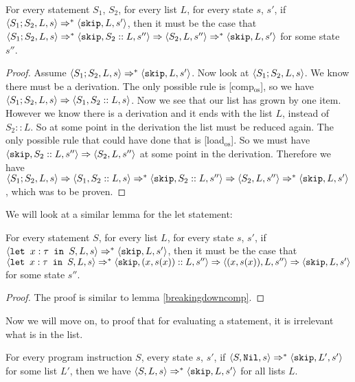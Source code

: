 \begin{lemma}
\label{breakingdowncomp}
For every statement $S_1$, $S_2$, for every list $L$, for every state $s$, $s'$, if $\langle S_1; S_2, L, s \rangle \Rightarrow ^{*} \langle \texttt{skip}, L, s' \rangle$, then it must be the case that $\langle S_1;S_2, L, s \rangle \Rightarrow ^{*} \langle \texttt{skip}, S_2::L, s'' \rangle \Rightarrow \langle S_2, L, s'' \rangle \Rightarrow ^{*} \langle \texttt{skip}, L, s' \rangle$ for some state $s''$. 
\end{lemma}

\begin{proof}
Assume $\langle S_1; S_2, L, s  \rangle \Rightarrow ^{*} \langle \texttt{skip}, L, s' \rangle$. Now look at $\langle S_1; S_2, L, s \rangle$. We know there must be a derivation. The only possible rule is [comp$_{\textrm{os}}$], so we have $\langle S_1; S_2, L, s \rangle \Rightarrow \langle S_1, S_2::L, s \rangle$. Now we see that our list has grown by one item. However we know there is a derivation and it ends with the list $L$, instead of $S_2::L$. So at some point in the derivation the list must be reduced again. The only possible rule that could have done that is [load$_{\textrm{os}}$]. So we must have $\langle \texttt{skip}, S_2::L, s'' \rangle \Rightarrow \langle S_2, L, s'' \rangle$ at some point in the derivation. Therefore we have $\langle S_1; S_2, L, s \rangle \Rightarrow \langle S_1, S_2::L, s \rangle \Rightarrow ^{*} \langle \texttt{skip}, S_2::L, s'' \rangle \Rightarrow \langle S_2, L, s'' \rangle \Rightarrow ^{*} \langle \texttt{skip}, L, s' \rangle$, which was to be proven.
\end{proof}

We will look at a similar lemma for the let statement:

\begin{lemma}
\label{breakingdownlet}
For every statement $S$, for every list $L$, for every state $s$, $s'$, if $\langle \texttt{let }x : \tau \texttt{ in } S, L, s \rangle \Rightarrow ^{*} \langle \texttt{skip}, L, s' \rangle$, then it must be the case that $\langle \texttt{let }x : \tau \texttt{ in } S, L, s \rangle \Rightarrow ^{*} \langle \texttt{skip}, (x,s(x))::L, s'' \rangle \Rightarrow \langle (x,s(x)), L, s'' \rangle \Rightarrow \langle \texttt{skip}, L, s' \rangle$ for some state $s''$. 
\end{lemma}

\begin{proof}
The proof is similar to lemma \ref{breakingdowncomp}. 
\end{proof}

Now we will move on, to proof that for evaluating a statement, it is irrelevant what is in the list. 

\begin{proposition}
For every program instruction $S$, every state $s$, $s'$, if $\langle S, \texttt{Nil}, s \rangle \Rightarrow ^{*} \langle \texttt{skip}, L', s' \rangle$ for some list $L'$, then we have $\langle S, L, s \rangle \Rightarrow ^{*} \langle \texttt{skip}, L, s' \rangle$ for all lists $L$. 
\end{proposition}

